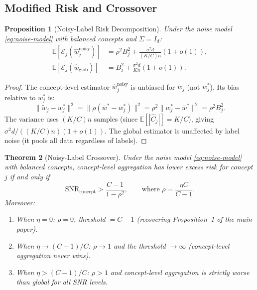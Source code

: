 \documentclass[11pt,a4paper]{article}
\newtheorem{theorem}{Theorem}
\newtheorem{proposition}[theorem]{Proposition}
\newcommand{\E}{\mathbb{E}}
\newcommand{\SNR}{\mathrm{SNR}}
\newcommand{\what}{\hat{w}}
\newcommand{\wbar}{\bar{w}}
\newcommand{\Id}{I_d}
\begin{document}
\subsection{Modified Risk and Crossover}

\begin{proposition}[Noisy-Label Risk Decomposition]\label{prop:noisy-risk}
Under the noise model \eqref{eq:noise-model} with balanced concepts and $\Sigma = \Id$:
\begin{align}
\E[\mathcal{E}_j(\what_j^{\mathrm{noisy}})]
&= \rho^2 B_j^2 + \frac{\sigma^2 d}{(K/C)n}(1 + o(1)), \label{eq:noisy-concept}\\
\E[\mathcal{E}_j(\what_{\mathrm{glob}})]
&= B_j^2 + \frac{\sigma^2 d}{Kn}(1 + o(1)). \label{eq:noisy-global}
\end{align}
\end{proposition}

\begin{proof}
The concept-level estimator $\what_j^{\mathrm{noisy}}$ is unbiased for $\widetilde{w}_j$ (not $w_j^*$). Its bias relative to $w_j^*$ is:
\[
\|\widetilde{w}_j - w_j^*\|^2 = \|\rho(\wbar^* - w_j^*)\|^2 = \rho^2 \|w_j^* - \wbar^*\|^2 = \rho^2 B_j^2.
\]
The variance uses $(K/C)n$ samples (since $\E[|\hat{C}_j|] = K/C$), giving $\sigma^2 d / ((K/C)n)(1 + o(1))$. The global estimator is unaffected by label noise (it pools all data regardless of labels).
\end{proof}

\begin{theorem}[Noisy-Label Crossover]\label{thm:noisy}
Under the noise model \eqref{eq:noise-model} with balanced concepts, concept-level aggregation has lower excess risk for concept $j$ if and only if
\begin{equation}\label{eq:noisy-crossover}
\boxed{\SNR_{\mathrm{concept}} > \frac{C - 1}{1 - \rho^2}}, \qquad \text{where } \rho = \frac{\eta C}{C - 1}.
\end{equation}
Moreover:
\begin{enumerate}[label=(\roman*)]
\item When $\eta = 0$: $\rho = 0$, threshold $= C - 1$ (recovering Proposition~1 of the main paper).
\item When $\eta \to (C-1)/C$: $\rho \to 1$ and the threshold $\to \infty$ (concept-level aggregation never wins).
\item When $\eta > (C-1)/C$: $\rho > 1$ and concept-level aggregation is \emph{strictly worse} than global for all SNR levels.
\end{enumerate}
\end{theorem}
\end{document}
